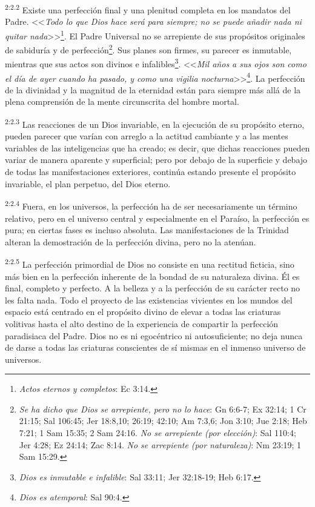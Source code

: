 \par
\textsuperscript{2:2.2} Existe una perfección final y una plenitud completa en los mandatos del Padre. <<\textit{Todo lo que Dios hace será para siempre; no se puede añadir nada ni quitar nada}>>\footnote{\textit{Actos eternos y completos}: Ec 3:14.}. El Padre Universal no se arrepiente de sus propósitos originales de sabiduría y de perfección\footnote{\textit{Se ha dicho que Dios se arrepiente, pero no lo hace}: Gn 6:6-7; Ex 32:14; 1 Cr 21:15; Sal 106:45; Jer 18:8,10; 26:19; 42:10; Am 7:3,6; Jon 3:10; Jue 2:18; Heb 7:21; 1 Sam 15:35; 2 Sam 24:16. \textit{No se arrepiente (por elección)}: Sal 110:4; Jer 4:28; Ez 24:14; Zac 8:14. \textit{No se arrepiente (por naturaleza)}: Nm 23:19; 1 Sam 15:29.}. Sus planes son firmes, su parecer es inmutable, mientras que sus actos son divinos e infalibles\footnote{\textit{Dios es inmutable e infalible}: Sal 33:11; Jer 32:18-19; Heb 6:17.}. <<\textit{Mil años a sus ojos son como el día de ayer cuando ha pasado, y como una vigilia nocturna}>>\footnote{\textit{Dios es atemporal}: Sal 90:4.}. La perfección de la divinidad y la magnitud de la eternidad están para siempre más allá de la plena comprensión de la mente circunscrita del hombre mortal.

\par
\textsuperscript{2:2.3} Las reacciones de un Dios invariable, en la ejecución de su propósito eterno, pueden parecer que varían con arreglo a la actitud cambiante y a las mentes variables de las inteligencias que ha creado; es decir, que dichas reacciones pueden variar de manera aparente y superficial; pero por debajo de la superficie y debajo de todas las manifestaciones exteriores, continúa estando presente el propósito invariable, el plan perpetuo, del Dios eterno.

\par
\textsuperscript{2:2.4} Fuera, en los universos, la perfección ha de ser necesariamente un término relativo, pero en el universo central y especialmente en el Paraíso, la perfección es pura; en ciertas fases es incluso absoluta. Las manifestaciones de la Trinidad alteran la demostración de la perfección divina, pero no la atenúan.

\par
\textsuperscript{2:2.5} La perfección primordial de Dios no consiste en una rectitud ficticia, sino más bien en la perfección inherente de la bondad de su naturaleza divina. Él es final, completo y perfecto. A la belleza y a la perfección de su carácter recto no les falta nada. Todo el proyecto de las existencias vivientes en los mundos del espacio está centrado en el propósito divino de elevar a todas las criaturas volitivas hasta el alto destino de la experiencia de compartir la perfección paradisiaca del Padre. Dios no es ni egocéntrico ni autosuficiente; no deja nunca de darse a todas las criaturas conscientes de sí mismas en el inmenso universo de universos.

